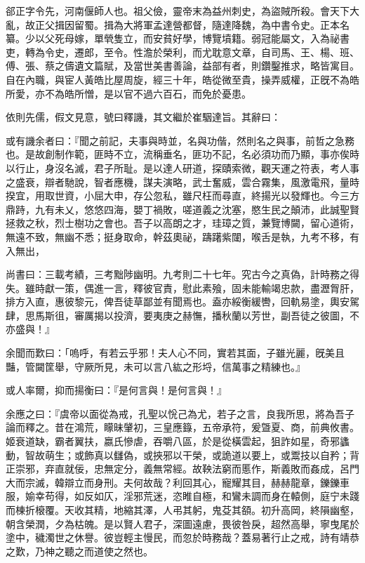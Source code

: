 
\begin{pinyinscope}
郤正字令先，河南偃師人也。祖父儉，靈帝末為益州刺史，為盜賊所殺。會天下大亂，故正父揖因留蜀。揖為大將軍孟達營都督，隨達降魏，為中書令史。正本名纂。少以父死母嫁，單煢隻立，而安貧好學，博覽墳籍。弱冠能屬文，入為祕書吏，轉為令史，遷郎，至令。性澹於榮利，而尤耽意文章，自司馬、王、楊、班、傅、張、蔡之儔遺文篇賦，及當世美書善論，益部有者，則鑽鑿推求，略皆寓目。自在內職，與宦人黃皓比屋周旋，經三十年，皓從微至貴，操弄威權，正旣不為皓所愛，亦不為皓所憎，是以官不過六百石，而免於憂患。

依則先儒，假文見意，號曰釋譏，其文繼於崔駰達旨。其辭曰：

或有譏余者曰：『聞之前記，夫事與時並，名與功偕，然則名之與事，前哲之急務也。是故創制作範，匪時不立，流稱垂名，匪功不記，名必須功而乃顯，事亦俟時以行止，身沒名滅，君子所耻。是以達人研道，探賾索微，觀天運之符表，考人事之盛衰，辯者馳說，智者應機，謀夫演略，武士奮威，雲合霧集，風激電飛，量時揆宜，用取世資，小屈大申，存公忽私，雖尺枉而尋直，終揚光以發輝也。今三方鼎跱，九有未乂，悠悠四海，嬰丁禍敗，嗟道義之沈塞，愍生民之顛沛，此誠聖賢拯救之秋，烈士樹功之會也。吾子以高朗之才，珪璋之質，兼覽博闚，留心道術，無遠不致，無幽不悉；挺身取命，幹茲奧祕，躊躇紫闥，喉舌是執，九考不移，有入無出，

尚書曰：三載考績，三考黜陟幽明。九考則二十七年。究古今之真偽，計時務之得失。雖時獻一策，偶進一言，釋彼官責，慰此素飱，固未能輸竭忠款，盡瀝胷肝，排方入直，惠彼黎元，俾吾徒草鄙並有聞焉也。盍亦綏衡緩轡，回軌易塗，輿安駕肆，思馬斯徂，審厲揭以投濟，要夷庚之赫憮，播秋蘭以芳世，副吾徒之彼圖，不亦盛與！』

余聞而歎曰：「嗚呼，有若云乎邪！夫人心不同，實若其面，子雖光麗，旣美且豔，管闚筐舉，守厥所見，未可以言八紘之形埒，信萬事之精練也。』

或人率爾，抑而揚衡曰：『是何言與！是何言與！』

余應之曰：『虞帝以面從為戒，孔聖以恱己為尤，若子之言，良我所思，將為吾子論而釋之。昔在鴻荒，矇昧肈初，三皇應籙，五帝承符，爰曁夏、商，前典攸書。姬衰道缺，霸者翼扶，嬴氏慘虐，吞嚼八區，於是從橫雲起，狙詐如星，奇邪蠭動，智故萌生；或飾真以讎偽，或挾邪以干榮，或詭道以要上，或鬻技以自矜；背正崇邪，弃直就佞，忠無定分，義無常經。故鞅法窮而慝作，斯義敗而姦成，呂門大而宗滅，韓辯立而身刑。夫何故哉？利回其心，寵耀其目，赫赫龍章，鑠鑠車服，媮幸苟得，如反如仄，淫邪荒迷，恣睢自極，和鸞未調而身在轅側，庭宁未踐而棟折榱覆。天收其精，地縮其澤，人弔其躬，鬼芟其頟。初升高岡，終隕幽壑，朝含榮潤，夕為枯魄。是以賢人君子，深圖遠慮，畏彼咎戾，超然高舉，寧曳尾於塗中，穢濁世之休譽。彼豈輕主慢民，而忽於時務哉？蓋易著行止之戒，詩有靖恭之歎，乃神之聽之而道使之然也。


\end{pinyinscope}
